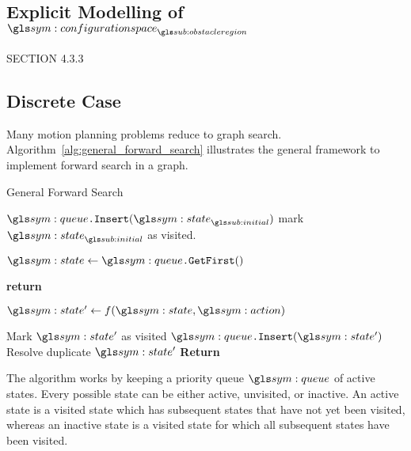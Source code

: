 	\subsection{Explicit Modelling of $\configurationspace_{\obstacleregion}$}%
	\label{sec:explicit_modelling_of_obstacle_region_configuration_space}

		SECTION 4.3.3

	\subsection{Discrete Case}%
	\label{sec:discrete_case}


		Many motion planning problems reduce to graph search.
		Algorithm~\ref{alg:general_forward_search}  illustrates the general framework to implement forward
		search in a graph.

		\begin{algorithm}[ht]
			\caption{General Forward Search}\label{alg:general_forward_search}
			\begin{algorithmic}[1]

					\State{} $\queue\code{.Insert}(\state_{\initial})$
					\State{} mark $\state_{\initial}$ as visited.

					\While{$\queue \neq \emptyset$}

						\State{} $\state \gets \queue\code{.GetFirst}()$
						\If{$\state \in \statespace_{\goal}$}

							\State{} \textbf{return} 

						\EndIf{}

						\ForAll{$\action \in \actionspace(\state)$}
							\State{} $\state' \gets f(\state, \action)$

								\State{} Mark $\state'$ as visited
								\State{} $\queue\code{.Insert}(\state')$
							\Else{}
								\State{} Resolve duplicate $\state'$
							\EndIf{}
						\EndFor{}
					\EndWhile{}
					\State{} \textbf{Return} 
				\EndProcedure{}
			\end{algorithmic}
		\end{algorithm}

		The algorithm works by keeping a priority queue $\queue$ of active
		states. Every possible state can be either active, unvisited, or
		inactive. An active state is a visited state which has subsequent states
		that have not yet been visited, whereas an inactive state is a visited
		state for which all subsequent states have been visited.

